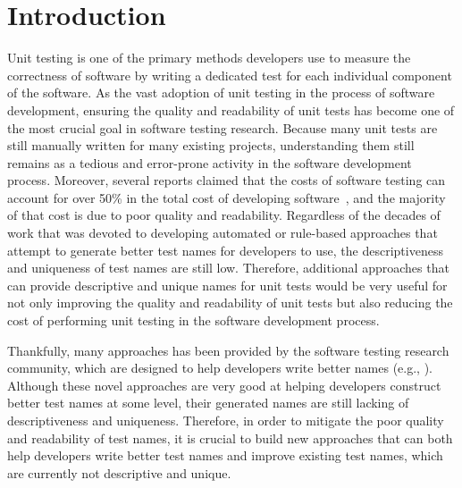\documentclass[proposal.tex]{subfiles}
\begin{document}
\newpage
\section{Introduction}
\label{sec:introduction}

Unit testing is one of the primary methods developers use to measure the correctness of software by writing a dedicated test for each individual component of the software. 
%
As the vast adoption of unit testing in the process of software development, ensuring the quality and readability of unit tests has become one of the most crucial goal in software testing research.
%
Because many unit tests are still manually written for many existing projects, understanding them still remains as a tedious and error-prone activity in the software development process.
%
Moreover, several reports claimed that the costs of software testing can account for over \num{50}\% in the total cost of developing software~\cite{anand2013orchestrated}, and the majority of that cost is due to poor quality and readability.
%
Regardless of the decades of work that was devoted to developing automated or rule-based approaches that attempt to generate better test names for developers to use, the descriptiveness and uniqueness of test names are still low.
%
Therefore, additional approaches that can provide descriptive and unique names for unit tests would be very useful for not only improving the quality and readability of unit tests but also reducing the cost of performing unit testing in the software development process.


Thankfully, many approaches has been provided by the software testing research community, which are designed to help developers write better names (e.g., \cite{host2009debugging,allamanis2014learning,pradel2018deepbugs,zhang2016towards,fraser2011evosuite,thummalapenta2009mseqgen,daka2017generating,allamanis2015suggesting}).
%
Although these novel approaches are very good at helping developers construct better test names at some level, their generated names are still lacking of descriptiveness and uniqueness.
%
Therefore, in order to mitigate the poor quality and readability of test names, it is crucial to build new approaches that can both help developers write better test names and improve existing test names, which are currently not descriptive and unique.
\end{document}
